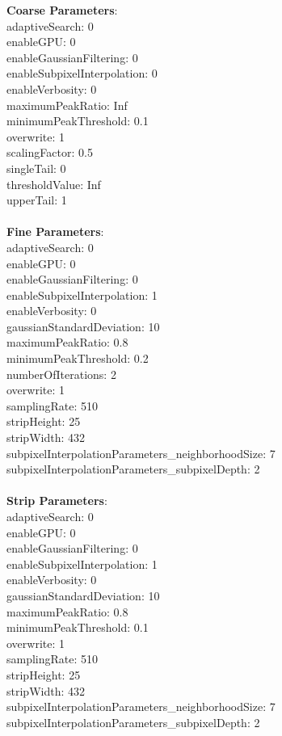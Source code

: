 \documentclass[11pt]{article}
\begin{document}
\textbf{Coarse Parameters}: \\
adaptiveSearch: 0\\
enableGPU: 0\\
enableGaussianFiltering: 0\\
enableSubpixelInterpolation: 0\\
enableVerbosity: 0\\
maximumPeakRatio: Inf\\
minimumPeakThreshold: 0.1\\
overwrite: 1\\
scalingFactor: 0.5\\
singleTail: 0\\
thresholdValue: Inf\\
upperTail: 1\\
\\
\textbf{Fine Parameters}: \\
adaptiveSearch: 0\\
enableGPU: 0\\
enableGaussianFiltering: 0\\
enableSubpixelInterpolation: 1\\
enableVerbosity: 0\\
gaussianStandardDeviation: 10\\
maximumPeakRatio: 0.8\\
minimumPeakThreshold: 0.2\\
numberOfIterations: 2\\
overwrite: 1\\
samplingRate: 510\\
stripHeight: 25\\
stripWidth: 432\\
subpixelInterpolationParameters\_neighborhoodSize: 7\\
subpixelInterpolationParameters\_subpixelDepth: 2\\
\\
\textbf{Strip Parameters}: \\
adaptiveSearch: 0\\
enableGPU: 0\\
enableGaussianFiltering: 0\\
enableSubpixelInterpolation: 1\\
enableVerbosity: 0\\
gaussianStandardDeviation: 10\\
maximumPeakRatio: 0.8\\
minimumPeakThreshold: 0.1\\
overwrite: 1\\
samplingRate: 510\\
stripHeight: 25\\
stripWidth: 432\\
subpixelInterpolationParameters\_neighborhoodSize: 7\\
subpixelInterpolationParameters\_subpixelDepth: 2\\
\\
\newpage
\end{document}
